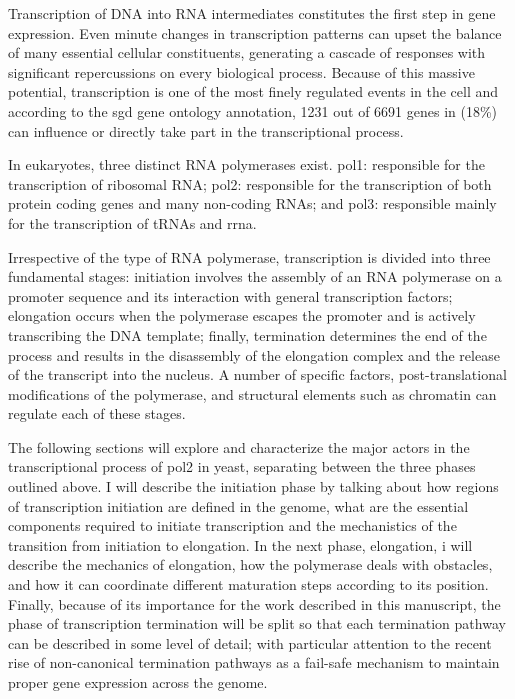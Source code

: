 
Transcription of DNA into RNA intermediates constitutes the first step in gene expression.
Even minute changes in transcription patterns can upset the balance of many essential cellular constituents, generating a cascade of responses with significant repercussions on every biological process.
Because of this massive potential, transcription is one of the most finely regulated events in the cell and according to the \gls{sgd} \cite{cherry:2012:saccharomyces} gene ontology annotation, 1231 out of 6691 genes in \cer{} (18\%) can influence or directly take part in the transcriptional process.

In eukaryotes, three distinct RNA polymerases exist. \gls{pol1}: responsible for the transcription of ribosomal RNA; \gls{pol2}: responsible for the transcription of both protein coding genes and many non-coding RNAs; and \gls{pol3}: responsible mainly for the transcription of tRNAs and \gls{rrna}. 

Irrespective of the type of RNA polymerase, transcription is divided into three fundamental stages: initiation involves the assembly of an RNA polymerase on a promoter sequence and its interaction with general transcription factors; elongation occurs when the polymerase escapes the promoter and is actively transcribing the DNA template; finally, termination determines the end of the process and results in the disassembly of the elongation complex and the release of the transcript into the nucleus. 
A number of specific factors, post-translational modifications of the polymerase, and structural elements such as chromatin can regulate each of these stages.

The following sections will explore and characterize the major actors in the transcriptional process of \gls{pol2} in yeast, separating between the three phases outlined above.
I will describe the initiation phase by talking about how regions of transcription initiation are defined in the genome, what are the essential components required to initiate transcription and the mechanistics of the transition from initiation to elongation.
In the next phase, elongation, i will describe the mechanics of elongation, how the polymerase deals with obstacles, and how it can coordinate different maturation steps according to its position.
Finally, because of its importance for the work described in this manuscript, the phase of transcription termination will be split so that each termination pathway can be described in some level of detail; with particular attention to the recent rise of non-canonical termination pathways as a fail-safe mechanism to maintain proper gene expression across the genome.   

